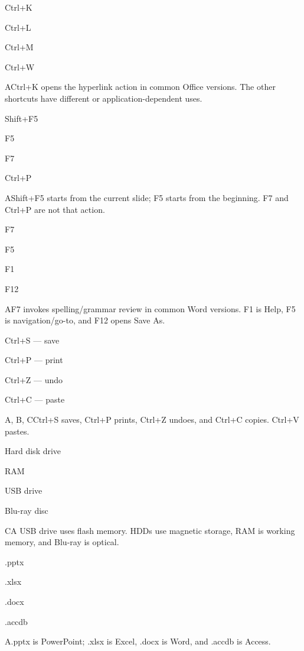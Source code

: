 \begin{enumerate}[label=\textbf{Q\arabic*.}, leftmargin=*]
  {\item Ctrl+K
   \item Ctrl+L
   \item Ctrl+M
   \item Ctrl+W}
  {A}{Ctrl+K opens the hyperlink action in common Office versions. The other shortcuts have different or application-dependent uses.}
  {\item Shift+F5
   \item F5
   \item F7
   \item Ctrl+P}
  {A}{Shift+F5 starts from the current slide; F5 starts from the beginning. F7 and Ctrl+P are not that action.}
  {\item F7
   \item F5
   \item F1
   \item F12}
  {A}{F7 invokes spelling/grammar review in common Word versions. F1 is Help, F5 is navigation/go-to, and F12 opens Save As.}
  {\item Ctrl+S --- save
   \item Ctrl+P --- print
   \item Ctrl+Z --- undo
   \item Ctrl+C --- paste}
  {A, B, C}{Ctrl+S saves, Ctrl+P prints, Ctrl+Z undoes, and Ctrl+C copies. Ctrl+V pastes.}
\fi
\ifnum{}
  {\item Hard disk drive
   \item RAM
   \item USB drive
   \item Blu-ray disc}
  {C}{A USB drive uses flash memory. HDDs use magnetic storage, RAM is working memory, and Blu-ray is optical.}
  {\item .pptx
   \item .xlsx
   \item .docx
   \item .accdb}
  {A}{.pptx is PowerPoint; .xlsx is Excel, .docx is Word, and .accdb is Access.}

\end{enumerate}
